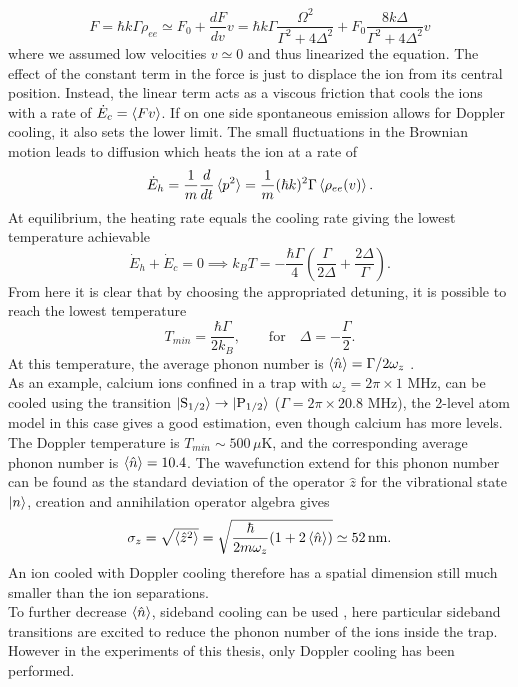 \begin{equation}
F = \hbar k \Gamma \rho_{ee} \simeq F_0 + \frac{dF}{dv}v = \hbar k \Gamma\frac{\Omega^2}{\Gamma^2 +4\Delta^2} + F_0 \frac{8k\Delta}{\Gamma^2 + 4\Delta^2}v
\end{equation}
where we assumed low velocities $v \simeq 0$ and thus linearized the equation. The effect of the constant term in the force is just to displace the ion from its central position. Instead, the linear term acts as a viscous friction that cools the ions with a rate of $\dot{E}_c = \braket{Fv}$.
If on one side spontaneous emission allows for Doppler cooling, it also sets the lower limit. The small fluctuations in the Brownian motion leads to diffusion which heats the ion at a rate of
\begin{equation}
\dot{E}_h = \frac{1}{m}\frac{d}{dt}\braket{p^2} =  \frac{1}{m}(\hbar k)^2 \Gamma \braket{\rho_{ee}(v)}.
\end{equation}
At equilibrium, the heating rate equals the cooling rate giving the lowest temperature achievable
\begin{equation}
\dot{E}_h + \dot{E}_c = 0  \implies k_B T = -\frac{\hbar \Gamma}{4}\left(\frac{\Gamma}{2\Delta} +\frac{2\Delta}{\Gamma}\right).
\end{equation}
From here it is clear that by choosing the appropriated detuning, it is possible to reach the lowest temperature
\begin{equation}
T_{min} = \frac{\hbar \Gamma}{2k_{B}}, \qquad \text{for} \quad \Delta = -\frac{\Gamma}{2}.
\end{equation}
At this temperature, the average phonon number is $\braket{\hat{n}} = \Gamma /2\omega_z$ \cite{Eschner:03}.\\
As an example, calcium ions confined in a trap with $\omega_z = 2\pi\times 1$ MHz, can be cooled using the transition $\ket{\text{S}_{1/2}}\to \ket{\text{P}_{1/2}}$ ($\Gamma = 2\pi\times 20.8$ MHz), the 2-level atom model in this case gives a good estimation, even though calcium has more levels. The Doppler temperature is $T_{min} \sim 500\,\mu$K, and the corresponding average phonon number is $\braket{\hat{n}} = 10.4$. The wavefunction extend for this phonon number can be found as the standard deviation of the operator $\hat{z}$ for the vibrational state $\ket{n}$, creation and annihilation operator algebra gives
\begin{equation}
\sigma_z = \sqrt{\braket{\hat{z}^2}} = \sqrt{\frac{\hbar}{2m\omega_z}(1+2\braket{\hat{n}})} \simeq 52\,\text{nm}.
\end{equation}
An ion cooled with Doppler cooling therefore has a spatial dimension still much smaller than the ion separations.\\
To further decrease $\braket{\hat{n}}$, sideband cooling can be used \cite{Eschner:03}, here particular sideband transitions are excited to reduce the phonon number of the ions inside the trap. However in the experiments of this thesis, only Doppler cooling has been performed.
